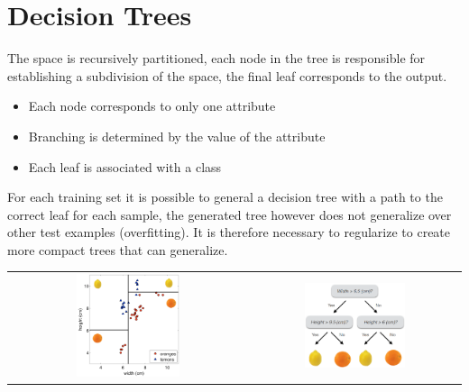 \section{Decision Trees}
The space is recursively partitioned, each node in the tree is responsible for establishing a subdivision of the space, the final leaf corresponds to the output.
\begin{itemize}
    \item Each node corresponds to only one attribute
    \item Branching is determined by the value of the attribute
    \item Each leaf is associated with a class
\end{itemize}
For each training set it is possible to general a decision tree with a path to the correct leaf for each sample, the generated tree however does not generalize over other test examples (overfitting). It is therefore necessary to regularize to create more compact trees that can generalize.
\begin{center}
    \begin{tabular}{c c}
        \includegraphics[width=0.45\textwidth]{images/DecisionTrees1.png} &
        \includegraphics[width=0.5\textwidth]{images/DecisionTrees2.png}
    \end{tabular}
\end{center}

